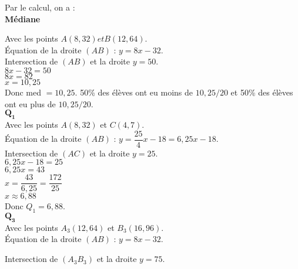 \vspace*{.3cm}

Par le calcul, on a : \\

\textbf{Médiane}

Avec les points $A(8,32) et B(12,64)$. \\

Équation de la droite $(AB)$ : $y=8x - 32$. \\

Intersection de $(AB)$ et la droite $y=50$. \\

$8x - 32 = 50$ \\

$ 8x = 82$ \\

$ x = 10,25 $ \\

Donc med $= 10,25$. 50\% des élèves ont eu moins de $10,25/20 $ et 50\% des élèves ont eu plus de $10,25/20$. \\

$\mathbf{Q_1}$  \\

Avec les points $A(8,32)$  et $C(4,7)$. \\

Équation de la droite $(AB)$ : $y=\dfrac{25}{4}x - 18 = 6,25x - 18$. \\

Intersection de $(AC)$ et la droite $y=25$. \\

$ 6,25x - 18 = 25$ \\

$ 6,25x = 43 $ \\

$ x = \dfrac{43}{6,25} = \dfrac{172}{25} $ \\

$ x \approx 6,88 $ \\

Donc $Q_1 = 6,88$. \\

$\mathbf{Q_3}$ \\

Avec les points $A_3(12,64)$  et $B_3(16,96)$. \\


Équation de la droite $(AB)$ : $y= 8x - 32$.

Intersection de $(A_3B_3)$ et la droite $y=75$. \\


